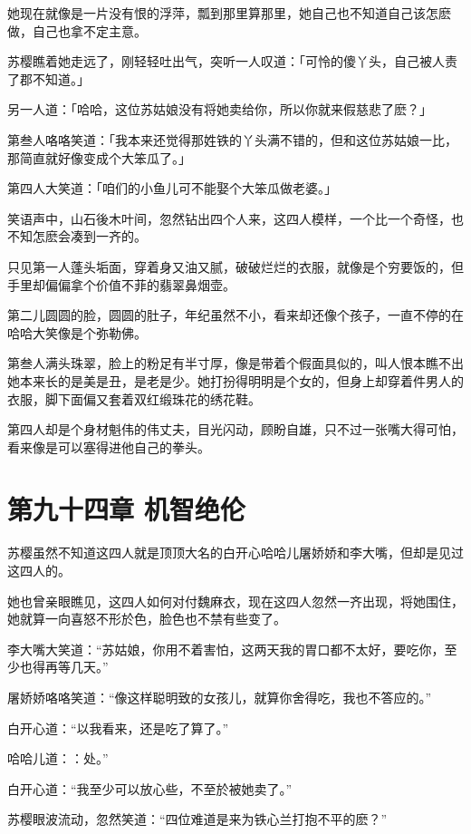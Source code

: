 \documentclass[12pt,oneside]{book}
\begin{document}
她现在就像是一片没有恨的浮萍，瓢到那里算那里，她自己也不知道自己该怎麽做，自己也拿不定主意。

苏樱瞧着她走远了，刚轻轻吐出气，突听一人叹道：「可怜的傻丫头，自己被人责了郡不知道。」

另一人道：「哈哈，这位苏姑娘没有将她卖给你，所以你就来假慈悲了麽？」

第叁人咯咯笑道：「我本来还觉得那姓铁的丫头满不错的，但和这位苏姑娘一比，那简直就好像变成个大笨瓜了。」

第四人大笑道：「咱们的小鱼儿可不能娶个大笨瓜做老婆。」

笑语声中，山石後木叶间，忽然钻出四个人来，这四人模样，一个比一个奇怪，也不知怎麽会凑到一齐的。

只见第一人蓬头垢面，穿着身又油又腻，破破烂烂的衣服，就像是个穷要饭的，但手里却偏偏拿个价值不菲的翡翠鼻烟壶。

第二儿圆圆的脸，圆圆的肚子，年纪虽然不小，看来却还像个孩子，一直不停的在哈哈大笑像是个弥勒佛。

第叁人满头珠翠，脸上的粉足有半寸厚，像是带着个假面具似的，叫人恨本瞧不出她本来长的是美是丑，是老是少。她打扮得明明是个女的，但身上却穿着件男人的衣服，脚下面偏又套着双红缎珠花的绣花鞋。

第四人却是个身材魁伟的伟丈夫，目光闪动，顾盼自雄，只不过一张嘴大得可怕，看来像是可以塞得进他自己的拳头。

\hypertarget{ux7b2cux4e5dux5341ux56dbux7ae0-ux673aux667aux7eddux4f26}{%
\chapter{第九十四章
机智绝伦}\label{ux7b2cux4e5dux5341ux56dbux7ae0-ux673aux667aux7eddux4f26}}

苏樱虽然不知道这四人就是顶顶大名的白开心哈哈儿屠娇娇和李大嘴，但却是见过这四人的。

她也曾亲眼瞧见，这四人如何对付魏麻衣，现在这四人忽然一齐出现，将她围住，她就算一向喜怒不形於色，脸色也不禁有些变了。

李大嘴大笑道：``苏姑娘，你用不着害怕，这两天我的胃口都不太好，要吃你，至少也得再等几天。''

屠娇娇咯咯笑道：``像这样聪明致的女孩儿，就算你舍得吃，我也不答应的。''

白开心道：``以我看来，还是吃了算了。''

哈哈儿道：：处。''

白开心道：``我至少可以放心些，不至於被她卖了。''

苏樱眼波流动，忽然笑道：``四位难道是来为铁心兰打抱不平的麽？''
\end{document}
